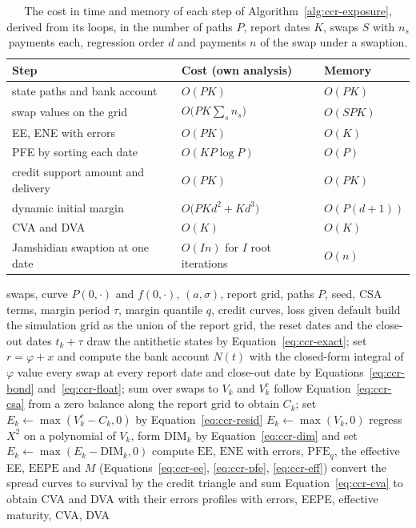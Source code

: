 \begin{table}[htbp]
\centering
\small
\caption{The cost in time and memory of each step of Algorithm~\ref{alg:ccr-exposure}, derived from its loops, in the number of paths $P$, report dates $K$, swaps $S$ with $n_s$ payments each, regression order $d$ and payments $n$ of the swap under a swaption.}
\label{tab:ccr-cost}
\begin{tabular}{p{4.2cm}p{4.2cm}p{4.2cm}}
\toprule
Step & Cost (own analysis) & Memory \\
\midrule
state paths and bank account & $O(PK)$ & $O(PK)$ \\
swap values on the grid & $O\big(PK\sum_sn_s\big)$ & $O(SPK)$ \\
EE, ENE with errors & $O(PK)$ & $O(K)$ \\
PFE by sorting each date & $O(KP\log P)$ & $O(P)$ \\
credit support amount and delivery & $O(PK)$ & $O(PK)$ \\
dynamic initial margin & $O\big(PKd^2+Kd^3\big)$ & $O(P(d+1))$ \\
CVA and DVA & $O(K)$ & $O(K)$ \\
Jamshidian swaption at one date & $O(In)$ for $I$ root iterations & $O(n)$ \\
\bottomrule
\end{tabular}
\end{table}

\begin{algorithm}[htbp]
\caption{The exposure, margin and CVA of a netting set along Hull-White paths (cases of C12; one simulation feeds all variants).}
\label{alg:ccr-exposure}
\begin{algorithmic}[1]
\Require swaps, curve $P(0,\cdot)$ and $f(0,\cdot)$, $(a,\sigma)$, report grid, paths $P$, seed, CSA terms, margin period $\tau$, margin quantile $q$, credit curves, loss given default
\State build the simulation grid as the union of the report grid, the reset dates and the close-out dates $t_k+\tau$
\State draw the antithetic states by Equation~\ref{eq:ccr-exact}; set $r=\varphi+x$ and compute the bank account $N(t)$ with the closed-form integral of $\varphi$
\State value every swap at every report date and close-out date by Equations~\ref{eq:ccr-bond} and~\ref{eq:ccr-float}; sum over swaps to $V_k$ and $V^{c}_k$
  \State follow Equation~\ref{eq:ccr-csa} from a zero balance along the report grid to obtain $C_k$; set $E_k\leftarrow\max(V^{c}_k-C_k,0)$ by Equation~\ref{eq:ccr-resid}
\Else \State $E_k\leftarrow\max(V_k,0)$ \EndIf
{} \State regress $X^2$ on a polynomial of $V_k$, form $\mathrm{DIM}_k$ by Equation~\ref{eq:ccr-dim} and set $E_k\leftarrow\max(E_k-\mathrm{DIM}_k,0)$ \EndIf
\State compute $\mathrm{EE}$, $\mathrm{ENE}$ with errors, $\mathrm{PFE}_q$, the effective EE, $\mathrm{EEPE}$ and $M$ (Equations~\ref{eq:ccr-ee}, \ref{eq:ccr-pfe}, \ref{eq:ccr-eff})
\State convert the spread curves to survival by the credit triangle and sum Equation~\ref{eq:ccr-cva} to obtain CVA and DVA with their errors
\Ensure profiles with errors, EEPE, effective maturity, CVA, DVA
\end{algorithmic}
\end{algorithm}

